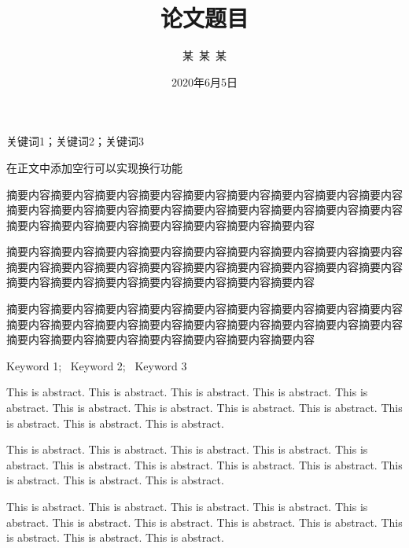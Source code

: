 \documentclass{shnuthesis}
\title{论文题目} %
\author{某~某~某} %
\date{2020年6月5日} %
\begin{document}
\maketitle


\clearpage   %

\begin{cnabstract}{关键词1；关键词2；关键词3}

在正文中添加空行可以实现换行功能
		
摘要内容摘要内容摘要内容摘要内容摘要内容摘要内容摘要内容摘要内容摘要内容摘要内容摘要内容摘要内容摘要内容摘要内容摘要内容摘要内容摘要内容摘要内容摘要内容摘要内容摘要内容摘要内容摘要内容摘要内容摘要内容
		
摘要内容摘要内容摘要内容摘要内容摘要内容摘要内容摘要内容摘要内容摘要内容摘要内容摘要内容摘要内容摘要内容摘要内容摘要内容摘要内容摘要内容摘要内容摘要内容摘要内容摘要内容摘要内容摘要内容摘要内容摘要内容

摘要内容摘要内容摘要内容摘要内容摘要内容摘要内容摘要内容摘要内容摘要内容摘要内容摘要内容摘要内容摘要内容摘要内容摘要内容摘要内容摘要内容摘要内容摘要内容摘要内容摘要内容摘要内容摘要内容摘要内容摘要内容

\end{cnabstract}



\begin{enabstract}{Keyword 1;~ Keyword 2;~ Keyword 3}


This is abstract. This is abstract. This is abstract. This is abstract. This is abstract. This is abstract. This is abstract. This is abstract. This is abstract. This is abstract. This is abstract. This is abstract.
		
This is abstract. This is abstract. This is abstract. This is abstract. This is abstract. This is abstract. This is abstract. This is abstract. This is abstract. This is abstract. This is abstract. This is abstract.

This is abstract. This is abstract. This is abstract. This is abstract. This is abstract. This is abstract. This is abstract. This is abstract. This is abstract. This is abstract. This is abstract. This is abstract.

\end{enabstract}
	
\end{document}
